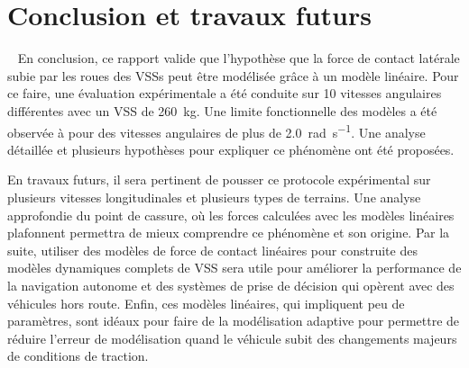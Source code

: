 \section{Conclusion et travaux futurs}~\label{sec:conclu}
En conclusion, ce rapport valide que l'hypothèse que la force de contact latérale subie par les roues des \acp{VSS} peut être modélisée grâce à un modèle linéaire.
Pour ce faire, une évaluation expérimentale a été conduite sur 10 vitesses angulaires différentes avec un \ac{VSS} de \SI{260}{\kg}.
Une limite fonctionnelle des modèles a été observée à pour des vitesses angulaires de plus de \SI{2.0}{\radian\per\second}.
Une analyse détaillée et plusieurs hypothèses pour expliquer ce phénomène ont été proposées.

En travaux futurs, il sera pertinent de pousser ce protocole expérimental sur plusieurs vitesses longitudinales et plusieurs types de terrains.
Une analyse approfondie du point de cassure, où les forces calculées avec les modèles linéaires plafonnent permettra de mieux comprendre ce phénomène et son origine.
Par la suite, utiliser des modèles de force de contact linéaires pour construite des modèles dynamiques complets de \ac{VSS} sera utile pour améliorer la performance de la navigation autonome et des systèmes de prise de décision qui opèrent avec des véhicules hors route.
Enfin, ces modèles linéaires, qui impliquent peu de paramètres, sont idéaux pour faire de la modélisation adaptive pour permettre de réduire l'erreur de modélisation quand le véhicule subit des changements majeurs de conditions de traction.